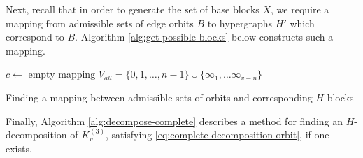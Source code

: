 Next, recall that in order to generate the set of base blocks $X$, we require a mapping from admissible sets of edge orbits $B$ to hypergraphs $H'$ which correspond to $B$. Algorithm \ref{alg:get-possible-blocks} below constructs such a mapping.

\begin{algorithm}

$c \gets$ empty mapping\;
$V_{all} = \{0, 1, \ldots, n-1\} \cup \{\infty_{1}, \ldots \infty_{v-n}\}$\;

\caption{Finding a mapping between admissible sets of orbits and corresponding $H$-blocks} \label{alg:get-possible-blocks}
\end{algorithm}

Finally, Algorithm \ref{alg:decompose-complete} describes a method for finding an $H$-decomposition of $K_{v}^{(3)}$, satisfying \eqref{eq:complete-decomposition-orbit}, if one exists.

